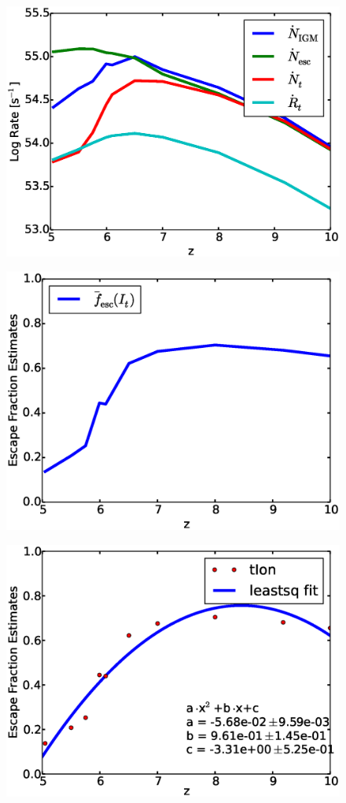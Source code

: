 \documentclass[letterpaper,10pt]{article}
\renewcommand{\(}{\left(}
\renewcommand{\)}{\right)}
\begin{document}
\begin{figure}
	\includegraphics[scale=0.45]{sanity_check_rate.eps}
\end{figure}
\begin{figure}
	\includegraphics[scale=0.45]{EscFraction.eps}
\end{figure}
\begin{figure}
	\includegraphics[scale=0.45]{EscFractionFit.eps}
\end{figure}
\end{document}
